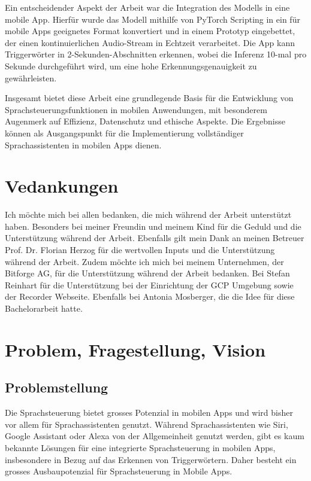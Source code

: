 \documentclass[11pt,a4paper]{article}
\begin{document}
\noindent \newline
Ein entscheidender Aspekt der Arbeit war die Integration des Modells in eine mobile App. Hierfür wurde 
das Modell mithilfe von PyTorch Scripting in ein für mobile Apps geeignetes Format konvertiert und 
in einem Prototyp eingebettet, der einen kontinuierlichen Audio-Stream in Echtzeit verarbeitet. Die 
App kann Triggerwörter in 2-Sekunden-Abschnitten erkennen, wobei die Inferenz 10-mal pro 
Sekunde durchgeführt wird, um eine hohe Erkennungsgenauigkeit zu gewährleisten.

\noindent \newline
Insgesamt bietet diese Arbeit eine grundlegende Basis für die Entwicklung von 
Sprachsteuerungsfunktionen in mobilen Anwendungen, mit besonderem Augenmerk auf Effizienz, 
Datenschutz und ethische Aspekte. Die Ergebnisse können als Ausgangspunkt für die Implementierung 
vollständiger Sprachassistenten in mobilen Apps dienen.


\section*{Vedankungen}
Ich möchte mich bei allen bedanken, die mich während der Arbeit unterstützt haben. Besonders bei 
meiner Freundin und meinem Kind für die Geduld und die Unterstützung während der Arbeit. Ebenfalls 
gilt mein Dank an meinen Betreuer Prof. Dr. Florian Herzog für die wertvollen Inputs und die 
Unterstützung während der Arbeit. Zudem möchte ich mich bei meinem Unternehmen, der Bitforge AG, 
für die Unterstützung während der Arbeit bedanken. Bei Stefan Reinhart für die Unterstützung bei 
der Einrichtung der GCP Umgebung sowie der Recorder Webseite. Ebenfalls bei Antonia 
Mosberger, die die Idee für diese Bachelorarbeit hatte.


\newpage
{}
\tableofcontents
{}
\newpage


\newpage \section{Problem, Fragestellung, Vision}
\subsection{Problemstellung}
Die Sprachsteuerung bietet grosses Potenzial in mobilen Apps und wird bisher vor allem für 
Sprachassistenten genutzt. Während Sprachassistenten wie Siri, Google Assistant oder Alexa 
von der Allgemeinheit genutzt werden, gibt es kaum bekannte Lösungen für eine integrierte 
Sprachsteuerung in mobilen Apps, insbesondere in Bezug auf das Erkennen von Triggerwörtern. Daher 
besteht ein grosses Ausbaupotenzial für 
Sprachsteuerung in Mobile Apps. 
\end{document}
